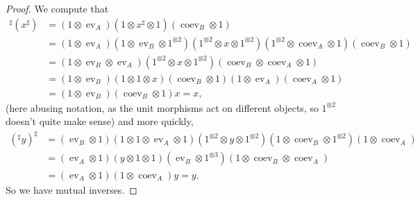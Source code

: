 \documentclass[a4paper,11pt]{article}
\theoremstyle{plain}
\theoremstyle{remark}
\newcommand{\ev}{\operatorname{ev}}
\newcommand{\coev}{\operatorname{coev}}
\begin{document}
\begin{proof}
We compute that
\begin{align*}
{}^\sharp(x^\sharp)
&= (1\otimes\ev_A)(1 \otimes x^\sharp\otimes 1)(\coev_B\otimes 1) \\
&= (1\otimes\ev_A)(1\otimes\ev_B\otimes1^{\otimes 2})(1^{\otimes 2}\otimes x\otimes 1^{\otimes 2})(1^{\otimes 2}\otimes\coev_A\otimes 1)(\coev_B\otimes 1) \\
&= (1\otimes\ev_B\otimes\ev_A)(1^{\otimes 2}\otimes x\otimes 1^{\otimes 2})(\coev_B\otimes\coev_A\otimes 1) \\
&= (1\otimes\ev_B)(1\otimes 1\otimes x)(\coev_B\otimes 1) (1\otimes\ev_A)(\coev_A\otimes 1) \\
&= (1\otimes\ev_B)(\coev_B\otimes 1) x = x,
\end{align*}
(here abusing notation, as the unit morphisms act on different objects, so $1^{\otimes 2}$ doesn't quite make sense) and more quickly,
\begin{align*}
({}^\sharp y)^\sharp
&= (\ev_B\otimes 1)(1\otimes 1\otimes \ev_A\otimes 1)(1^{\otimes 2}\otimes y\otimes1^{\otimes 2})(1\otimes\coev_B\otimes 1^{\otimes 2})(1\otimes\coev_A) \\
&= (\ev_A\otimes 1)(y\otimes 1\otimes 1) (\ev_B\otimes 1^{\otimes3})(1\otimes\coev_B\otimes\coev_A) \\
&= (\ev_A\otimes 1)(1\otimes\coev_A) y = y.
\end{align*}
So we have mutual inverses.


\end{proof}
\end{document}
